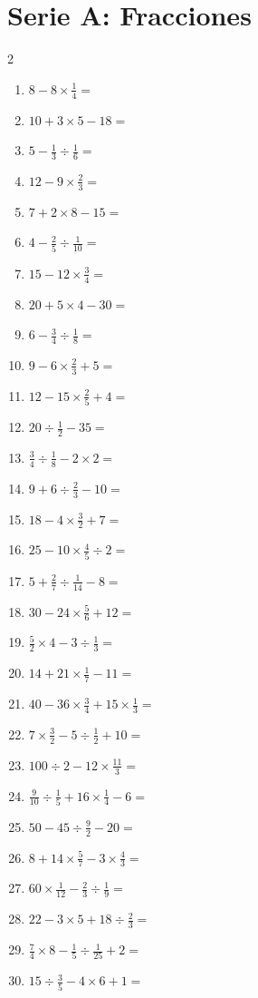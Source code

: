 \documentclass[11pt, letterpaper]{article}
\begin{document}
\section*{Serie A: Fracciones}
\begin{multicols}{2}
	\begin{enumerate}[label=\textbf{\arabic*.} , itemsep=2.2cm]
		\item $8 - 8 \times \frac{1}{4} = $
		\item $10 + 3 \times 5 - 18 = $
		\item $5 - \frac{1}{3} \div \frac{1}{6} = $
		\item $12 - 9 \times \frac{2}{3} = $
		\item $7 + 2 \times 8 - 15 = $
		\item $4 - \frac{2}{5} \div \frac{1}{10} = $
		\item $15 - 12 \times \frac{3}{4} = $
		\item $20 + 5 \times 4 - 30 = $
		\item $6 - \frac{3}{4} \div \frac{1}{8} = $
		\item $9 - 6 \times \frac{2}{3} + 5 = $
		\item $12 - 15 \times \frac{2}{5} + 4 = $
		\item $20 \div \frac{1}{2} - 35 = $
		\item $\frac{3}{4} \div \frac{1}{8} - 2 \times 2 = $
		\item $9 + 6 \div \frac{2}{3} - 10 = $
		\item $18 - 4 \times \frac{3}{2} + 7 = $
		\item $25 - 10 \times \frac{4}{5} \div 2 = $
		\item $5 + \frac{2}{7} \div \frac{1}{14} - 8 = $
		\item $30 - 24 \times \frac{5}{6} + 12 = $
		\item $\frac{5}{2} \times 4 - 3 \div \frac{1}{3} = $
		\item $14 + 21 \times \frac{1}{7} - 11 = $
		\item $40 - 36 \times \frac{3}{4} + 15 \times \frac{1}{3} = $
		\item $7 \times \frac{3}{2} - 5 \div \frac{1}{2} + 10 = $
		\item $100 \div 2 - 12 \times \frac{11}{3} = $
		\item $\frac{9}{10} \div \frac{1}{5} + 16 \times \frac{1}{4} - 6 = $
		\item $50 - 45 \div \frac{9}{2} - 20 = $
		\item $8 + 14 \times \frac{5}{7} - 3 \times \frac{4}{3} = $
		\item $60 \times \frac{1}{12} - \frac{2}{3} \div \frac{1}{9} = $
		\item $22 - 3 \times 5 + 18 \div \frac{2}{3} = $
		\item $\frac{7}{4} \times 8 - \frac{1}{5} \div \frac{1}{25} + 2 = $
		\item $15 \div \frac{3}{5} - 4 \times 6 + 1 = $
	\end{enumerate}
\end{multicols}
\end{document}

